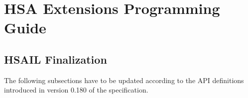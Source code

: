 \documentclass[final]{book}
\begin{document}
\chapter{HSA Extensions Programming Guide}

\section{HSAIL Finalization}
\label{finalizerchapter} \hypertarget{finalizerchapter}{}

The following subsections have to be updated according to the API definitions
introduced in version 0.180 of the specification.






\end{document}
